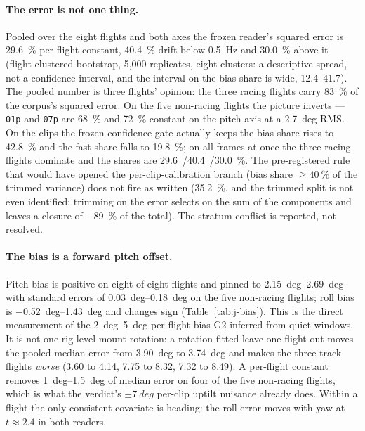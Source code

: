 \paragraph{The error is not one thing.} Pooled over the eight flights and both axes the frozen
reader's squared error is \SI{29.6}{\percent} per-flight constant, \SI{40.4}{\percent} drift below
\SI{0.5}{Hz} and \SI{30.0}{\percent} above it (flight-clustered bootstrap, 5{,}000 replicates,
eight clusters: a descriptive spread, not a confidence interval, and the interval on the bias share
is wide, \numrange{12.4}{41.7}). The pooled number is three flights' opinion: the three racing
flights carry \SI{83}{\percent} of the corpus's squared error. On the five non-racing flights the
picture inverts --- \texttt{01p} and \texttt{07p} are \SI{68}{\percent} and \SI{72}{\percent}
constant on the pitch axis at a \SI{2.7}{deg} RMS. On the clips the frozen confidence gate actually
keeps the bias share rises to \SI{42.8}{\percent} and the fast share falls to
\SI{19.8}{\percent}; on all frames at once the three racing flights dominate and the shares are
\SI{29.6}{/}\SI{40.4}{/}\SI{30.0}{\percent}. The pre-registered rule that would have opened the
per-clip-calibration branch (bias share $\ge \SI{40}{\percent}$ of the trimmed variance) does not
fire as written (\SI{35.2}{\percent}, and the trimmed split is not even identified: trimming on
the error selects on the sum of the components and leaves a closure of \SI{-89}{\percent} of the
total). The stratum conflict is reported, not resolved.

\paragraph{The bias is a forward pitch offset.} Pitch bias is positive on eight of eight flights
and pinned to \SIrange{2.15}{2.69}{deg} with standard errors of \SIrange{0.03}{0.18}{deg} on the
five non-racing flights; roll bias is \SIrange{-0.52}{1.43}{deg} and changes sign
(Table~\ref{tab:j-bias}). This is the direct measurement of the \SIrange{2}{5}{deg} per-flight bias
G2 inferred from quiet windows. It is not one rig-level mount rotation: a rotation fitted
leave-one-flight-out moves the pooled median error from \SI{3.90}{deg} to \SI{3.74}{deg} and makes
the three track flights \emph{worse} (\num{3.60} to \num{4.14}, \num{7.75} to \num{8.32},
\num{7.32} to \num{8.49}). A per-flight constant removes \SIrange{1}{1.5}{deg} of median error on
four of the five non-racing flights, which is what the verdict's $\pm\SI{7}{deg}$ per-clip uptilt
nuisance already does. Within a flight the only consistent covariate is heading: the roll error
moves with yaw at $t\approx2.4$ in both readers.

